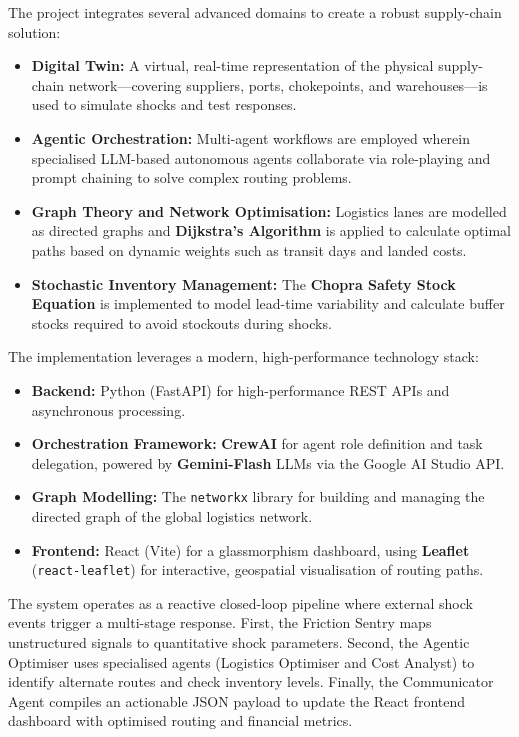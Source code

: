 The project integrates several advanced domains to create a robust supply-chain solution:
\begin{itemize}
    \item \textbf{Digital Twin:} A virtual, real-time representation of the physical supply-chain network---covering suppliers, ports, chokepoints, and warehouses---is used to simulate shocks and test responses.
    \item \textbf{Agentic Orchestration:} Multi-agent workflows are employed wherein specialised LLM-based autonomous agents collaborate via role-playing and prompt chaining to solve complex routing problems.
    \item \textbf{Graph Theory and Network Optimisation:} Logistics lanes are modelled as directed graphs and \textbf{Dijkstra's Algorithm} is applied to calculate optimal paths based on dynamic weights such as transit days and landed costs.
    \item \textbf{Stochastic Inventory Management:} The \textbf{Chopra Safety Stock Equation} is implemented to model lead-time variability and calculate buffer stocks required to avoid stockouts during shocks.
\end{itemize}

The implementation leverages a modern, high-performance technology stack:
\begin{itemize}
    \item \textbf{Backend:} Python (FastAPI) for high-performance REST APIs and asynchronous processing.
    \item \textbf{Orchestration Framework:} \textbf{CrewAI} for agent role definition and task delegation, powered by \textbf{Gemini-Flash} LLMs via the Google AI Studio API.
    \item \textbf{Graph Modelling:} The \texttt{networkx} library for building and managing the directed graph of the global logistics network.
    \item \textbf{Frontend:} React (Vite) for a glassmorphism dashboard, using \textbf{Leaflet} (\texttt{react-leaflet}) for interactive, geospatial visualisation of routing paths.
\end{itemize}

The system operates as a reactive closed-loop pipeline where external shock events trigger a multi-stage response. First, the Friction Sentry maps unstructured signals to quantitative shock parameters. Second, the Agentic Optimiser uses specialised agents (Logistics Optimiser and Cost Analyst) to identify alternate routes and check inventory levels. Finally, the Communicator Agent compiles an actionable JSON payload to update the React frontend dashboard with optimised routing and financial metrics.

